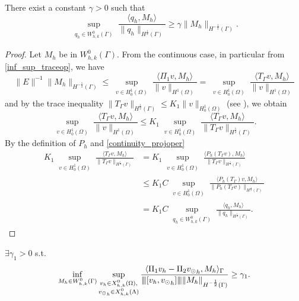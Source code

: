 \begin{lemma}\label{lemma:trspace_infsup} 
There exist a constant $\gamma >0$ such that
\begin{equation*}
\sup_{\substack{q_h \in W_{h,k}^0(\Gamma)}} \frac{\langle q_h , M_h \rangle}{ \|q_h\|_{H^{\frac 12}(\Gamma)}} \geq \gamma \|M_h\|_{H^{-\frac 12}(\Gamma)}.
\end{equation*} 
\end{lemma}
\begin{proof}
Let $M_h$ be in $W_{h,k}^0(\Gamma)$. From the continuous case, in particular from \eqref{inf_sup_traceop}, we have
\begin{equation*}
\|E\|^{-1} \|M_h\|_{H^{-\frac 12}(\Gamma)} \leq \sup_{\substack{v \in H^1_0(\Omega)}} \frac{\langle \Pi_1 v , M_h \rangle}{\|v\|_{H^1(\Omega)}} =\sup_{\substack{v \in H^1_0(\Omega)}} \frac{\langle T_{\Gamma} v , M_h \rangle}{\|v\|_{H^1(\Omega)}}
\end{equation*}
and by the trace inequality $\|T_{\Gamma}v\|_{H^\frac 12 (\Gamma)} \leq K_1 \|v\|_{H^1_0(\Omega)}$ (see \cite[7.56]{adams1975pure}), we obtain 
\begin{equation*}
\sup_{\substack{v \in H^1_0(\Omega)}} \frac{\langle T_{\Gamma} v , M_h \rangle}{\|v\|_{H^1(\Omega)}}
\leq K_1 \sup_{\substack{v \in H^1_0(\Omega)}} \frac{\langle T_{\Gamma} v , M_h \rangle}{ \|T_{\Gamma}v\|_{H^{\frac 12}(\Gamma)}}.
\end{equation*}
By the definition of $P_h$ and \eqref{continuity_projoper} 
\begin{equation*}
\begin{split}
K_1 \sup_{\substack{v \in H^1_0(\Omega)}} \frac{\langle T_{\Gamma} v , M_h \rangle}{ \|T_{\Gamma}v\|_{H^{\frac 12}(\Gamma)}}&= K_1 \sup_{\substack{v \in H^1_0(\Omega)}} \frac{\langle P_h(T_{\Gamma} v) , M_h \rangle}{ \|T_{\Gamma}v\|_{H^{\frac 12}(\Gamma)}}\\
&\leq  K_1 C \sup_{\substack{v \in H^1_0(\Omega)}} \frac{\langle P_h(T_{\Gamma}) v , M_h \rangle}{ \|P_h(T_{\Gamma}v)\|_{H^{\frac 12}(\Gamma)}}\\
&= K_1 C \sup_{\substack{q_h \in W_{h,k}^0(\Gamma)}} \frac{\langle q_h , M_h \rangle}{  \|q_h\|_{H^{\frac 12}(\Gamma)}}.
\end{split}
\end{equation*}
\end{proof}

\begin{theorem} 
$\exists \gamma _1 >0$ s.t.
\begin{equation}\label{inf_sup_discrete_prob1}
\inf_{M_h \in W^0_{h,k}(\Gamma)} 
\sup_{\substack{v_h \in X^0_{h,k}(\Omega),\\ {\vd}_h \in X^0_{h,k}(\Lambda)}} \frac{ \langle \Pi_1 v_h - \Pi_2 {\vd}_h, M_h \rangle _{\Gamma}} {\vertiii{[v_h, {\vd} _h]} \|M_h\|_{H^{-\frac 12 }(\Gamma)}} 
\geq \gamma _1. 
\end{equation}
\end{theorem}

